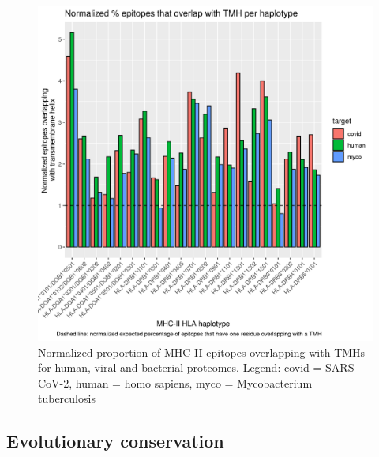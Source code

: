 \begin{figure}[!htbp]
  \includegraphics[width=\textwidth]{bbbq_1_smart_results/fig_f_tmh_mhc2_2_normalized.png}
  \caption{
    Normalized proportion of MHC-II epitopes overlapping with TMHs
    for human, viral and bacterial proteomes.
    Legend: covid = SARS-CoV-2,
    human = homo sapiens, myco = Mycobacterium tuberculosis
  }
  \label{fig:f_tmh_mhc2_normalized}
\end{figure}



\subsection{Evolutionary conservation}



